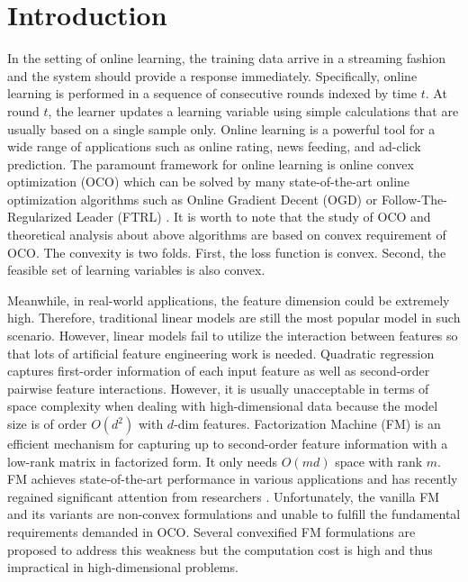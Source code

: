 \documentclass[letterpaper]{article} %
\theoremstyle{plain}
\theoremstyle{definition}
\begin{document}
\section{Introduction}
In the setting of online learning, the training data arrive in a streaming fashion and the system should provide a response immediately. Specifically, online learning is performed in a sequence of consecutive rounds indexed by time $t$. At round $t$, the learner updates a learning variable using simple calculations that are usually based on a single sample only. Online learning is a powerful tool for a wide range of applications such as online rating, news feeding, and ad-click prediction. The paramount framework for online learning is online convex optimization (OCO) \cite{HazanOCO,ShalevOCO} which can be solved by many state-of-the-art online optimization algorithms such as Online Gradient Decent (OGD) \cite{ZinkevichICML} or Follow-The-Regularized Leader (FTRL) \cite{McMahanKDD}. It is worth to note that the study of OCO and theoretical analysis about above algorithms are based on convex requirement of OCO. The convexity is two folds. First, the loss function is convex. Second, the feasible set of learning variables is also convex.

Meanwhile, in real-world applications, the feature dimension could be extremely high. Therefore, traditional linear models are still the most popular model in such scenario. However, linear models fail to utilize the interaction between features so that lots of artificial feature engineering work is needed. Quadratic regression captures first-order information of each input feature as well as second-order pairwise feature interactions. However, it is usually unacceptable in terms of space complexity when dealing with high-dimensional data because the model size is of order $O(d^2)$ with $d$-dim features. Factorization Machine (FM) \cite{RendleICDM} is an efficient mechanism for capturing up to second-order feature information with a low-rank matrix in factorized form. It only needs $O(md)$ space with rank $m$. FM achieves state-of-the-art performance in various applications \cite{JuanWWW,LiDifacto,LuWSDM,NguyenSIGIR,RendleSIGIR,ZhongCIKM,ChenFMVAE,ChenRaFM} and has recently regained significant attention from researchers \cite{BlondelNIPS,BlondelICML,HeIJCAI,XuICDM}. Unfortunately, the vanilla FM \cite{RendleICDM} and its variants \cite{BlondelNIPS,ChengACM,JuanWWW,LuWSDM} are non-convex formulations and unable to fulfill the fundamental requirements demanded in OCO. Several convexified FM formulations \cite{BlondelECML,LinWWW,YamadaKDD} are proposed to address this weakness but the computation cost is high and thus impractical in high-dimensional problems.
\end{document}
